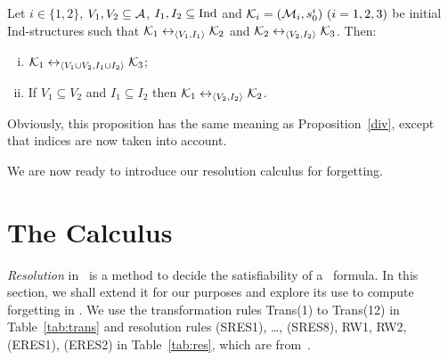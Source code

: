 \documentclass[letterpaper]{article}
\begin{document}
\begin{proposition}\label{pro:VI:div}
Let $i\in \{1,2\}$, $V_1,V_2\subseteq\cal A$, $I_1, I_2 \subseteq \textrm{Ind}$
and ${\cal K}_i=({\cal M}_i,s_0^i)~(i=1,2,3)$ be initial Ind-structures
 such that
${\cal K}_1\leftrightarrow_{{\langle{V_1, I_1}\rangle}}{\cal K}_2$ and ${\cal K}_2\leftrightarrow_{{\langle{V_2,I_2}\rangle}}{\cal K}_3$.
 Then:
 \begin{enumerate}[(i)]
   \item ${\cal K}_1\leftrightarrow_{{\langle{V_1\cup V_2, I_1 \cup I_2}\rangle}}{\cal K}_3$;
   \item If $V_1 \subseteq V_2$ and $I_1 \subseteq I_2$ then ${\cal K}_1 \leftrightarrow_{{\langle{V_2, I_2}\rangle}} {\cal K}_2$.
 \end{enumerate}
\end{proposition}

Obviously, this proposition has the same meaning as Proposition~\ref{div}, except that indices are now taken into account.

We are now ready to introduce our resolution calculus for forgetting. 


\section{The Calculus}
\emph{Resolution} in \CTL\ is a method to decide the satisfiability of a \CTL\ formula.
In this section, we shall extend it for our purposes and explore its use to compute forgetting in \CTL.
We use the transformation rules Trans(1) to Trans(12) in Table~\ref{tab:trans} and resolution rules (SRES1), \dots, (SRES8), RW1, RW2, (ERES1), (ERES2) in Table~\ref{tab:res}, which are from~\cite{zhang2009refined}. 
\end{document}
